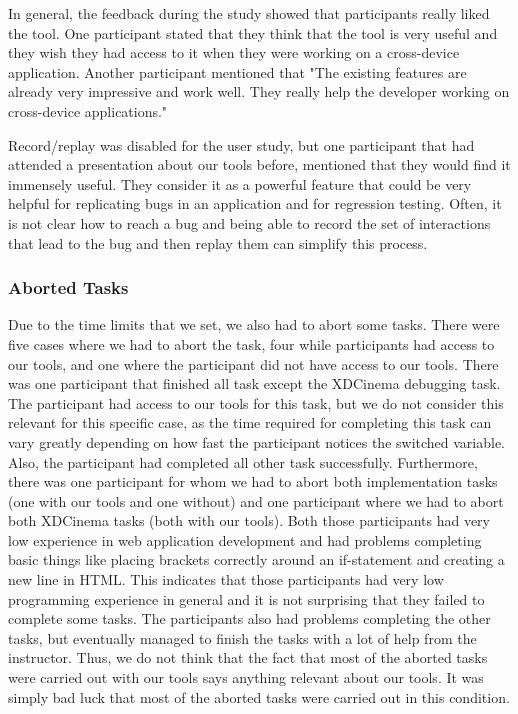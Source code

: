 In general, the feedback during the study showed that participants really liked the tool. One participant stated that they think that the tool is very useful and they wish they had access to it when they were working on a cross-device application. Another participant mentioned that "The existing features are already very impressive and work well. They really help the developer working on cross-device applications."

Record/replay was disabled for the user study, but one participant that had attended a presentation about our tools before, mentioned that they would find it immensely useful. They consider it as a powerful feature that could be very helpful for replicating bugs in an application and for regression testing. Often, it is not clear how to reach a bug and being able to record the set of interactions that lead to the bug and then replay them can simplify this process.

\subsubsection{Aborted Tasks}

Due to the time limits that we set, we also had to abort some tasks. There were five cases where we had to abort the task, four while participants had access to our tools, and one where the participant did not have access to our tools. There was one participant that finished all task except the XDCinema debugging task. The participant had access to our tools for this task, but we do not consider this relevant for this specific case, as the time required for completing this task can vary greatly depending on how fast the participant notices the switched variable. Also, the participant had completed all other task successfully. Furthermore, there was one participant for whom we had to abort both implementation tasks (one with our tools and one without) and one participant where we had to abort both XDCinema tasks (both with our tools). Both those participants had very low experience in web application development and had problems completing basic things like placing brackets correctly around an if-statement and creating a new line in HTML. This indicates that those participants had very low programming experience in general and it is not surprising that they failed to complete some tasks. The participants also had problems completing the other tasks, but eventually managed to finish the tasks with a lot of help from the instructor. Thus, we do not think that the fact that most of the aborted tasks were carried out with our tools says anything relevant about our tools. It was simply bad luck that most of the aborted tasks were carried out in this condition.

